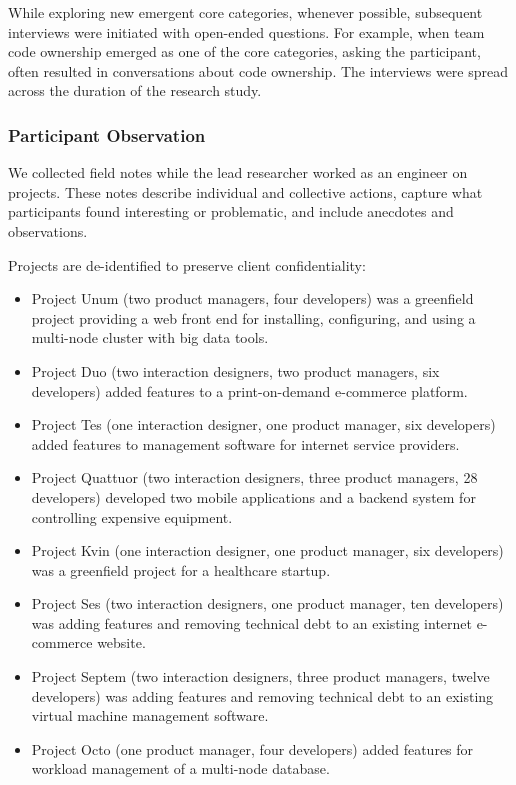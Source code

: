 While exploring new emergent core categories, whenever possible, subsequent interviews were initiated with open-ended questions.  For example, when team code ownership emerged as one of the core categories, asking the participant,  often resulted in conversations about code ownership. The interviews were spread across the duration of the research study. 


\subsubsection{Participant Observation}
We collected field notes while the lead researcher worked as an engineer on \numberOfObservedProjects{} projects. These notes describe individual and collective actions, capture what participants found interesting or problematic, and include anecdotes and observations.

Projects are de-identified to preserve client confidentiality:
\begin{itemize}
\item Project Unum (two product managers, four developers) was a greenfield project providing a web front end for installing, configuring, and using a multi-node cluster with big data tools. 
\item Project Duo (two interaction designers, two product managers, six developers) added features to a print-on-demand e-commerce platform. 
\item Project Tes (one interaction designer, one product manager, six developers) added features to management software for internet service providers.
\item Project Quattuor (two interaction designers, three product managers, 28 developers) developed two mobile applications and a backend system for controlling expensive equipment.
\item Project Kvin (one interaction designer, one product manager, six developers) was a greenfield project for a healthcare startup. 
\item Project Ses (two interaction designers, one product manager, ten developers) was adding features and removing technical debt to an existing internet e-commerce website.
\item Project Septem (two interaction designers, three product managers, twelve developers) was adding features and removing technical debt to an existing virtual machine management software.
\item Project Octo (one product manager, four developers) added features for workload management of a multi-node database.
\end{itemize}



